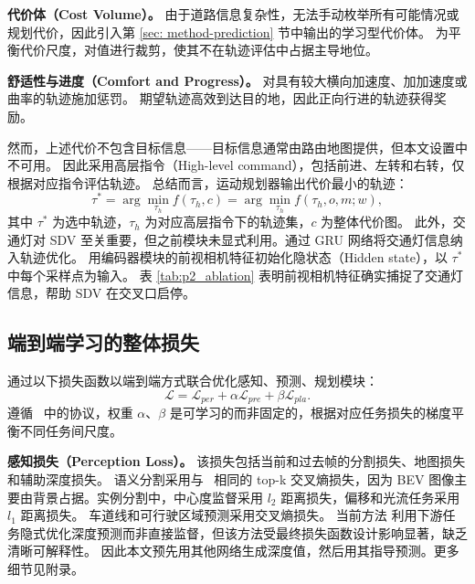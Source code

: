\documentclass[runningheads]{llncs}
\begin{document}
\noindent\textbf{代价体（Cost Volume）。} 由于道路信息复杂性，无法手动枚举所有可能情况或规划代价，因此引入第 \ref{sec: method-prediction} 节中输出的学习型代价体。
%
为平衡代价尺度，对值进行裁剪，使其不在轨迹评估中占据主导地位。

\noindent\textbf{舒适性与进度（Comfort and Progress）。} 对具有较大横向加速度、加加速度或曲率的轨迹施加惩罚。
%
期望轨迹高效到达目的地，因此正向行进的轨迹获得奖励。



然而，上述代价不包含目标信息——目标信息通常由路由地图提供，但本文设置中不可用。
%
因此采用高层指令（High-level command），包括前进、左转和右转，仅根据对应指令评估轨迹。
%
%
%
%
总结而言，运动规划器输出代价最小的轨迹：
\begin{equation}
    \tau^* = \arg\min_{\tau_h} f(\tau_h, c) = \arg\min_{\tau_h} f(\tau_h, o, m; w), 
    \label{eq:over_obj}
\end{equation}
其中 $\tau^*$ 为选中轨迹，$\tau_h$ 为对应高层指令下的轨迹集，$c$ 为整体代价图。
%
%
此外，交通灯对 SDV 至关重要，但之前模块未显式利用。通过 GRU 网络将交通灯信息纳入轨迹优化。
%
%
用编码器模块的前视相机特征初始化隐状态（Hidden state），以 $\tau^*$ 中每个采样点为输入。
%
%
表 \ref{tab:p2_ablation} 表明前视相机特征确实捕捉了交通灯信息，帮助 SDV 在交叉口启停。

\subsection{端到端学习的整体损失
}\label{sec: method-e2e learning}
通过以下损失函数以端到端方式联合优化感知、预测、规划模块：
\begin{equation}
    \mathcal{L} =  \mathcal{L}_{per} + \alpha \mathcal{L}_{pre} + \beta \mathcal{L}_{pla}.
\end{equation}
遵循~\cite{kendall2018multi,chen2018gradnorm} 中的协议，权重 $\alpha$、$\beta$ 是可学习的而非固定的，根据对应任务损失的梯度平衡不同任务间尺度。

\noindent\textbf{感知损失（Perception Loss）。}
%
该损失包括当前和过去帧的分割损失、地图损失和辅助深度损失。
%
语义分割采用与~\cite{hu2021fiery} 相同的 top-k 交叉熵损失，因为 BEV 图像主要由背景占据。实例分割中，中心度监督采用 $l_2$ 距离损失，偏移和光流任务采用 $l_1$ 距离损失。
%
车道线和可行驶区域预测采用交叉熵损失。
%
%
当前方法\cite{philion2020lift,wang2021learning} 利用下游任务隐式优化深度预测而非直接监督，但该方法受最终损失函数设计影响显著，缺乏清晰可解释性。
%
因此本文预先用其他网络生成深度值，然后用其指导预测。更多细节见附录。
\end{document}
